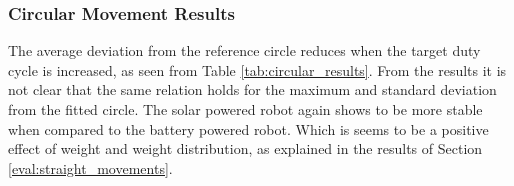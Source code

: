 \subsubsection{Circular Movement Results}
The average deviation from the reference circle reduces when the target duty cycle is increased, as seen from Table \ref{tab:circular_results}.
From the results it is not clear that the same relation holds for the maximum and standard deviation from the fitted circle.
The solar powered robot again shows to be more stable when compared to the battery powered robot.
Which is seems to be a positive effect of weight and weight distribution, as explained in the results of Section \ref{eval:straight_movements}.
